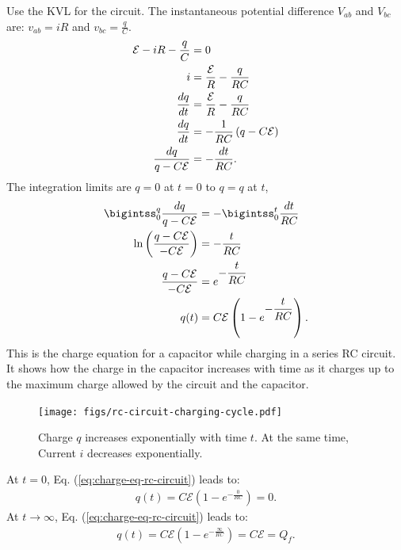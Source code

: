 \documentclass[12pt,b4paper]{article}
\begin{document}
Use the KVL for the circuit. The instantaneous potential difference $V_{ab}$ and $V_{bc}$ are: $v_{ab}=iR$ and $\displaystyle v_{bc}=\frac{q}{C}$.
\begin{align}
    \mathcal{E}-iR-\frac{q}{C}&=0\notag\\
    i&=\frac{\mathcal{E}}{R}-\frac{q}{RC}\\
    \frac{dq}{dt}&=\frac{\mathcal{E}}{R}-\frac{q}{RC}\notag\\
    \frac{dq}{dt}&=-\frac{1}{RC}\left(q-C\mathcal{E}\right)\notag\\
    \frac{dq}{q-C\mathcal{E}}&=-\frac{dt}{RC}.\notag
\end{align}
The integration limits are $q=0$ at $t=0$ to $q=q$ at $t$,
\begin{align}
    \bigintss_{0}^{q}\frac{dq}{q-C\mathcal{E}}&=-\bigintss_{0}^{t}\frac{dt}{RC}\notag\\
    \ln\left(\frac{q-C\mathcal{E}}{-C\mathcal{E}}\right)&=-\frac{t}{RC}\notag\\
    \frac{q-C\mathcal{E}}{-C\mathcal{E}}&=e^{\displaystyle-\frac{t}{RC}}\notag\\
    q(t)&=C\mathcal{E}\left(1-e^{\displaystyle-\frac{t}{RC}}\right).\label{eq:charge-eq-rc-circuit}
\end{align}
This is the charge equation for a capacitor while charging in a series RC circuit. It shows how the charge in the capacitor increases with time as it charges up to the maximum charge allowed by the circuit and the capacitor.
\begin{figure}[H]
    \centering
    \texttt{[image: figs/rc-circuit-charging-cycle.pdf]}
    \caption{Charge $q$ increases exponentially with time $t$. At the same time, Current $i$ decreases exponentially.}
    \label{fig:rc-charging-cycle}
\end{figure}
At $t=0$, Eq. (\ref{eq:charge-eq-rc-circuit}) leads to:
\begin{align*}
    q(t)=C\mathcal{E}\left(1-e^{\displaystyle-\frac{0}{RC}}\right)=0.
\end{align*}
At $t\to\infty$, Eq. (\ref{eq:charge-eq-rc-circuit}) leads to:
\begin{align*}
    q(t)=C\mathcal{E}\left(1-e^{\displaystyle-\frac{\infty}{RC}}\right)=C\mathcal{E}=Q_f.
\end{align*}
\end{document}

